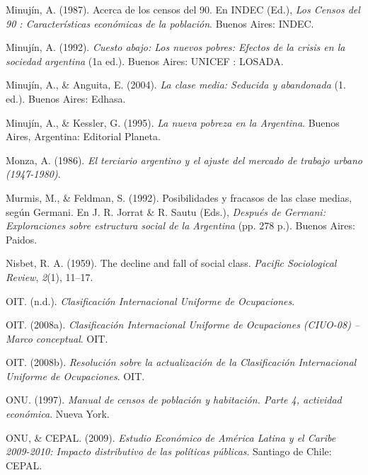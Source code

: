 \documentclass[
]{article}
\newlength{\cslhangindent}
\newlength{\cslentryspacingunit} %
\newenvironment{CSLReferences}[2] %
 {%
  \setlength{\parindent}{0pt}
  \ifodd #1
  \let\oldpar\par
  \def\par{\hangindent=\cslhangindent\oldpar}
  \fi
  \setlength{\parskip}{#2\cslentryspacingunit}
 }%
 {}
\begin{document}
\begin{CSLReferences}{1}{0}
\leavevmode{}%
Minujín, A. (1987). Acerca de los censos del 90. En INDEC (Ed.), \emph{Los {Censos} del 90 : Características económicas de la población}. Buenos Aires: INDEC.

\leavevmode{}%
Minujín, A. (1992). \emph{Cuesto abajo: Los nuevos pobres: Efectos de la crisis en la sociedad argentina} (1a ed.). Buenos Aires: UNICEF : LOSADA.

\leavevmode{}%
Minujín, A., \& Anguita, E. (2004). \emph{La clase media: Seducida y abandonada} (1. ed.). Buenos Aires: Edhasa.

\leavevmode{}%
Minujín, A., \& Kessler, G. (1995). \emph{La nueva pobreza en la {Argentina}}. Buenos Aires, Argentina: Editorial Planeta.

\leavevmode{}%
Monza, A. (1986). \emph{El terciario argentino y el ajuste del mercado de trabajo urbano (1947-1980)}.

\leavevmode{}%
Murmis, M., \& Feldman, S. (1992). Posibilidades y fracasos de las clase medias, según {Germani}. En J. R. Jorrat \& R. Sautu (Eds.), \emph{Después de {Germani}: {Exploraciones} sobre estructura social de la {Argentina}} (pp. 278 p.). Buenos Aires: Paidos.

\leavevmode{}%
Nisbet, R. A. (1959). The decline and fall of social class. \emph{Pacific Sociological Review}, \emph{2}(1), 11--17.

\leavevmode{}%
OIT. (n.d.). \emph{Clasificación {Internacional} {Uniforme} de {Ocupaciones}}.

\leavevmode{}%
OIT. (2008a). \emph{Clasificación {Internacional} {Uniforme} de {Ocupaciones} ({CIUO}-08) -- {Marco} conceptual}. OIT.

\leavevmode{}%
OIT. (2008b). \emph{Resolución sobre la actualización de la {Clasificación} {Internacional} {Uniforme} de {Ocupaciones}}. OIT.

\leavevmode{}%
ONU. (1997). \emph{Manual de censos de población y habitación. {Parte} 4, actividad económica}. Nueva York.

\leavevmode{}%
ONU, \& CEPAL. (2009). \emph{Estudio {Económico} de {América} {Latina} y el {Caribe} 2009-2010: Impacto distributivo de las políticas públicas}. Santiago de Chile: CEPAL.


\end{CSLReferences}
\end{document}
